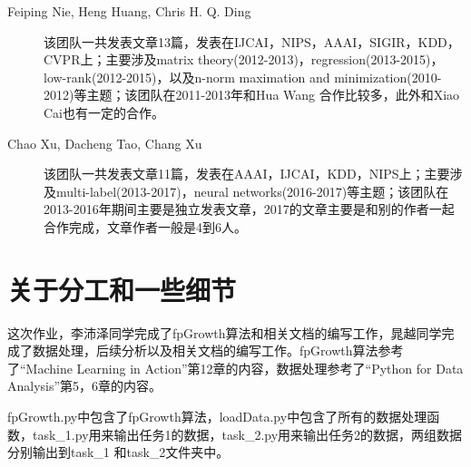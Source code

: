 \documentclass[a4paper,oneside,12pt]{article}
\begin{document}
\begin{spacing}{1.5}
\begin{description}
  \item[Feiping Nie, Heng Huang, Chris H. Q. Ding] 该团队一共发表文章13篇，发表在IJCAI，NIPS，AAAI，SIGIR，KDD，CVPR上；主要涉及matrix theory(2012-2013)，regression(2013-2015)，low-rank(2012-2015)，以及n-norm maximation and minimization(2010-2012)等主题；该团队在2011-2013年和Hua Wang 合作比较多，此外和Xiao Cai也有一定的合作。
  \item[Chao Xu, Dacheng Tao, Chang Xu] 该团队一共发表文章11篇，发表在AAAI，IJCAI，KDD，NIPS上；主要涉及multi-label(2013-2017)，neural networks(2016-2017)等主题；该团队在2013-2016年期间主要是独立发表文章，2017的文章主要是和别的作者一起合作完成，文章作者一般是4到6人。
\end{description}

\section{关于分工和一些细节}
这次作业，李沛泽同学完成了fpGrowth算法和相关文档的编写工作，晁越同学完成了数据处理，后续分析以及相关文档的编写工作。fpGrowth算法参考了``Machine Learning in Action''第12章的内容，数据处理参考了``Python for Data Analysis''第5，6章的内容。\par
fpGrowth.py中包含了fpGrowth算法，loadData.py中包含了所有的数据处理函数，task\_1.py用来输出任务1的数据，task\_2.py用来输出任务2的数据，两组数据分别输出到task\_1 和task\_2文件夹中。



%

\end{spacing}
\end{document}
